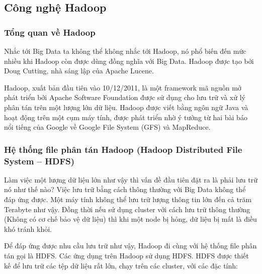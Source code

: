 \documentclass[12pt]{report}
\begin{document}
\subsection{Công nghệ Hadoop}
\subsubsection{Tổng quan về Hadoop}

Nhắc tới Big Data ta không thể không nhắc tới Hadoop, nó phổ biến đến mức nhiều khi Hadoop còn được dùng đồng nghĩa với Big Data. Hadoop được tạo bởi Doug Cutting, nhà sáng lập của Apache Lucene.

Hadoop, xuất bản đầu tiên vào 10/12/2011\cite{hadoop}, là một framework mã nguồn mở phát triển bởi Apache Software Foundation được sử dụng cho lưu trữ và xử lý phân tán trên một lượng lớn dữ liệu. Hadoop được viết bằng ngôn ngữ Java và hoạt động trên một cụm máy tính,  được phát triển nhờ ý tưởng từ hai bài báo nổi tiếng của Google về Google File System (GFS) và MapReduce. 

\subsubsection{Hệ thống file phân tán Hadoop (Hadoop Distributed File System – HDFS)}

Làm việc một lượng dữ liệu lớn như vậy thì vấn đề đầu tiên đặt ra là phải lưu trữ nó như thế nào? Việc lưu trữ bằng cách thông thường với Big Data không thể đáp ứng được. Một máy tính không thể lưu trữ lượng thông tin lớn đến cả trăm Terabyte như vậy. Đồng thời nếu sử dụng cluster với cách lưu trữ thông thường (Không có cơ chế bảo vệ dữ liệu) thì khi một node bị hỏng, dữ liệu bị mất là điều khó tránh khỏi.

Để đáp ứng được nhu cầu lưu trữ như vậy, Hadoop đi cùng với hệ thống file phân tán gọi là HDFS. Các ứng dụng trên Hadoop sử dụng HDFS. HDFS được thiết kế để lưu trữ các tệp dữ liệu rất lớn, chạy trên các cluster, với các đặc tính:
\end{document}
